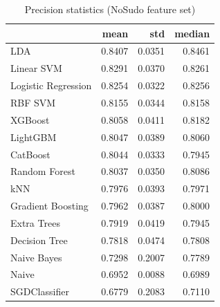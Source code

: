 \begin{table}
\caption{Precision statistics (NoSudo feature set)}
\label{tab:precision_NoSudo_stats}
\begin{tabular}{lrrr}
\toprule
 & mean & std & median \\
\midrule
LDA & 0.8407 & 0.0351 & 0.8461 \\
Linear SVM & 0.8291 & 0.0370 & 0.8261 \\
Logistic Regression & 0.8254 & 0.0322 & 0.8256 \\
RBF SVM & 0.8155 & 0.0344 & 0.8158 \\
XGBoost & 0.8058 & 0.0411 & 0.8182 \\
LightGBM & 0.8047 & 0.0389 & 0.8060 \\
CatBoost & 0.8044 & 0.0333 & 0.7945 \\
Random Forest & 0.8037 & 0.0350 & 0.8086 \\
kNN & 0.7976 & 0.0393 & 0.7971 \\
Gradient Boosting & 0.7962 & 0.0387 & 0.8000 \\
Extra Trees & 0.7919 & 0.0419 & 0.7945 \\
Decision Tree & 0.7818 & 0.0474 & 0.7808 \\
Naive Bayes & 0.7298 & 0.2007 & 0.7789 \\
Naive & 0.6952 & 0.0088 & 0.6989 \\
SGDClassifier & 0.6779 & 0.2083 & 0.7110 \\
\bottomrule
\end{tabular}
\end{table}
